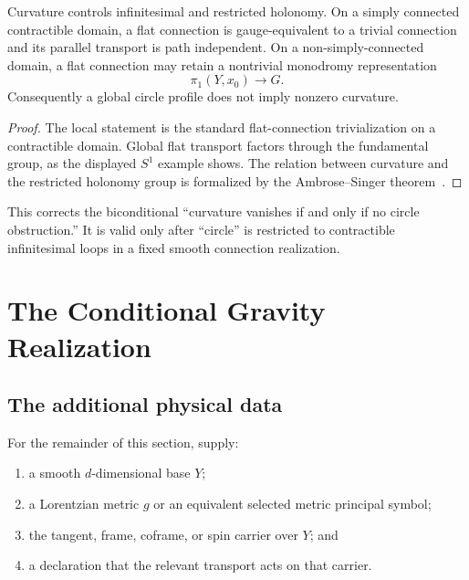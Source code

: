 \documentclass[11pt]{article}
\begin{document}
\begin{theorem}
\label{thm:flat-holonomy}
Curvature controls infinitesimal and restricted holonomy.  On a simply
connected contractible domain, a flat connection is gauge-equivalent to a
trivial connection and its parallel transport is path independent.  On a
non-simply-connected domain, a flat connection may retain a nontrivial
monodromy representation
\[
 \pi_1(Y,x_0)\longrightarrow G.
\]
Consequently a global circle profile does not imply nonzero curvature.
\end{theorem}

\begin{proof}
The local statement is the standard flat-connection trivialization on a
contractible domain.  Global flat transport factors through the fundamental
group, as the displayed $S^1$ example shows.  The relation between curvature
and the restricted holonomy group is formalized by the
Ambrose--Singer theorem~\cite{KobayashiNomizu}.
\end{proof}

This corrects the biconditional ``curvature vanishes if and only if no circle
obstruction.''  It is valid only after ``circle'' is restricted to
contractible infinitesimal loops in a fixed smooth connection realization.

\section{The Conditional Gravity Realization}

\subsection{The additional physical data}

\begin{assumption}\label{ass:gravity}
For the remainder of this section, supply:
\begin{enumerate}
\item a smooth $d$-dimensional base $Y$;
\item a Lorentzian metric $g$ or an equivalent selected metric principal
symbol;
\item the tangent, frame, coframe, or spin carrier over $Y$; and
\item a declaration that the relevant transport acts on that carrier.
\end{enumerate}
\end{assumption}
\end{document}
